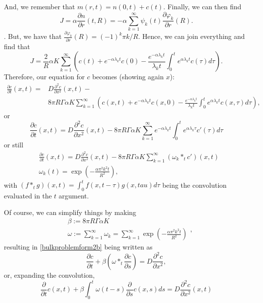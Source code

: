 \documentclass[]{article}
\newcommand{\pderiv}[2]{\frac{\partial #1}{\partial #2}}
\begin{document}
And, we remember that $m(r,t) = n(0,t) + c(t)$. Finally, we can then find
\begin{equation}
J = \alpha \pderiv{n}{r} (t,R) = -\alpha \sum_{k=1}^\infty \psi_k(t) \pderiv{\varphi_k}{r}(R).
\end{equation}.
But, we have that $\pderiv{\varphi_k}{r}(R) = (-1)^k \pi k/R$. Hence, we can join everything and find that
\begin{equation}
J = \frac{2}{R} \alpha K \sum_{k=1}^\infty \left(c(t) + e^{-\alpha \lambda_k t} c(0) - \frac{e^{-\alpha \lambda_k t}}{\lambda_k t} \int_0^t e^{\alpha \lambda_k t} c(\tau) d\tau \right).
\end{equation}
Therefore, our equation for $c$ becomes (showing again $x$):
\begin{equation}\label{bulkproblemform1}
\begin{split}
\pderiv{c}{t}(x,t) = & D \frac{\partial^2 c}{\partial x^2}(x,t) - \\
& 8 \pi R \Gamma \alpha K \sum_{k=1}^\infty \left(c(x,t) + e^{-\alpha \lambda_k t} c(x,0) - \frac{e^{-\alpha \lambda_k t}}{\lambda_k t} \int_0^t e^{\alpha \lambda_k t} c(x, \tau) d\tau \right),
\end{split}
\end{equation}
or
\begin{equation}\label{bulkproblemform2a}
\pderiv{c}{t}(x,t) = D \frac{\partial^2 c}{\partial x^2}(x,t) - 8 \pi R \Gamma \alpha K \sum_{k=1}^\infty e^{-\alpha \lambda_k t} \int_0^t e^{\alpha \lambda_k \tau} c'(\tau) d \tau
\end{equation}
or still
\begin{equation}\label{bulkproblemform2b}
\begin{split}
& \pderiv{c}{t}(x,t) = D \frac{\partial^2 c}{\partial x^2}(x,t) - 8 \pi R \Gamma \alpha K \sum_{k=1}^\infty (\omega_k *_t c')(x,t) \\
& \omega_k(t) = \exp \left( -\frac{\alpha \pi^2 k^2 t}{R^2} \right),
\end{split}
\end{equation}
with $(f *_t g)(x,t) = \int_0^t f(x, t - \tau) g(x, tau) d\tau $ being the convolution evaluated in the $t$ argument.

Of course, we can simplify things by making
\begin{equation}\label{auxiliarydefinitions2}
	\begin{split}
	& \beta := 8 \pi R \Gamma \alpha K \\
	& \omega := \sum_{k=1}^\infty \omega_k = \sum_{k=1}^\infty \exp \left( -\frac{\alpha \pi^2 k^2 t}{R^2} \right)
	\end{split},
\end{equation}
resulting in \eqref{bulkproblemform2b} being written as
\begin{equation}\label{bulkproblemform2}
	\pderiv{c}{t} + \beta \left(\omega *_t \pderiv{c}{s}\right) = D \frac{\partial^2 c}{\partial x^2},
\end{equation}
or, expanding the convolution,
\begin{equation}\label{bulkproblemform3}
	\pderiv{}{t} c(x, t) + \beta \int_0^t \omega(t - s) \pderiv{}{s} c(x, s) ds = D \frac{\partial^2 c}{\partial x^2}(x,t)
\end{equation}
\end{document}
